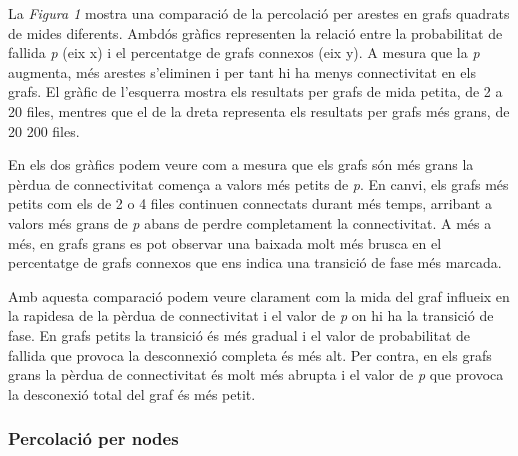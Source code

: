 \documentclass[a4paper]{article}
\begin{document}
	La \textit{Figura 1} mostra una comparació de la percolació per arestes en grafs quadrats de mides diferents. Ambdós gràfics representen la relació entre la probabilitat de fallida \textit{p} (eix x) i el percentatge de grafs connexos (eix y). A mesura que la \textit{p} augmenta, més arestes s'eliminen i per tant hi ha menys connectivitat en els grafs. El gràfic de l'esquerra mostra els resultats per grafs de mida petita, de 2 a 20 files, mentres que el de la dreta representa els resultats per grafs més grans, de 20 200 files. 
	
	En els dos gràfics podem veure com a mesura que els grafs són més grans la pèrdua de connectivitat comença a valors més petits de \textit{p}. En canvi, els grafs més petits com els de 2 o 4 files continuen connectats durant més temps, arribant a valors més grans de \textit{p} abans de perdre completament la connectivitat. A més a més, en grafs grans es pot observar una baixada molt més brusca en el percentatge de grafs connexos que ens indica una transició de fase més marcada.
	
	Amb aquesta comparació podem veure clarament com la mida del graf influeix en la rapidesa de la pèrdua de connectivitat i el valor de \textit{p} on hi ha la transició de fase. En grafs petits la transició és més gradual i el valor de probabilitat de fallida que provoca la desconnexió completa és més alt. Per contra, en els grafs grans la pèrdua de connectivitat és molt més abrupta i el valor de \textit{p} que provoca la desconexió total del graf és més petit.
	
	
	\subsubsection{Percolació per nodes}
	
\end{document}
